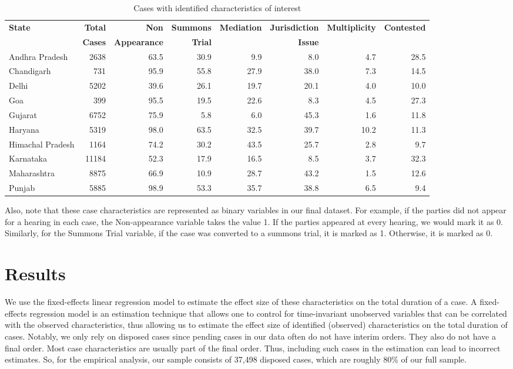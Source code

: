 \documentclass[12pt,a4paper]{article}
\begin{document}
\begin{table}[!ht]
\caption{Cases with identified characteristics of interest}
\label{tab:case_chars}
\centering
\footnotesize
\begin{tabular}{@{}lrrrrrrr@{}}
\toprule
\multirow{2}{*}{\textbf{State}} & \textbf{Total}& \textbf{Non} & \textbf{Summons} & \textbf{Mediation} & \textbf{Jurisdiction} & \textbf{Multiplicity} & \textbf{Contested} \\
& \textbf{Cases} & \textbf{Appearance} & \textbf{Trial} & & \textbf{Issue} & &\\
\midrule
  Andhra Pradesh & 2638 & 63.5 & 30.9 & 9.9 & 8.0 & 4.7 & 28.5\\
  Chandigarh & 731 & 95.9 & 55.8 & 27.9 & 38.0 & 7.3 & 14.5\\
  Delhi & 5202 & 39.6 & 26.1 & 19.7 & 20.1 & 4.0 & 10.0\\
  Goa & 399 & 95.5 & 19.5 & 22.6 & 8.3 & 4.5 & 27.3\\
  Gujarat & 6752 & 75.9 & 5.8 & 6.0 & 45.3 & 1.6 & 11.8\\
  Haryana & 5319 & 98.0 & 63.5 & 32.5 & 39.7 & 10.2 & 11.3\\
  Himachal Pradesh & 1164 & 74.2 & 30.2 & 43.5 & 25.7 & 2.8 & 9.7\\
  Karnataka & 11184 & 52.3 & 17.9 & 16.5 & 8.5 & 3.7 & 32.3\\
  Maharashtra & 8875 & 66.9 & 10.9 & 28.7 & 43.2 & 1.5 & 12.6\\
  Punjab & 5885 & 98.9 & 53.3 & 35.7 & 38.8 & 6.5 & 9.4\\
  \bottomrule
\end{tabular}
\end{table}

Also, note that these case characteristics are represented as binary variables in our final dataset. For example, if the parties did not appear for a hearing in each case, the Non-appearance variable takes the value 1. If the parties appeared at every hearing, we would mark it as 0. Similarly, for the Summons Trial variable, if the case was converted to a summons trial, it is marked as 1. Otherwise, it is marked as 0.

\section{Results}
\label{sec:results}

We use the fixed-effects linear regression model to estimate the effect size of these characteristics on the total duration of a case. A fixed-effects regression model is an estimation technique that allows one to control for time-invariant unobserved variables that can be correlated with the observed characteristics, thus allowing us to estimate the effect size of identified (observed) characteristics on the total duration of cases. Notably, we only rely on disposed cases since pending cases in our data often do not have interim orders. They also do not have a final order. Most case characteristics are usually part of the final order. Thus, including such cases in the estimation can lead to incorrect estimates. So, for the empirical analysis, our sample consists of 37,498 disposed cases, which are roughly 80\% of our full sample.
\end{document}
